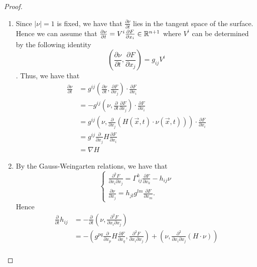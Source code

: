 \begin{proof}
\begin{enumerate}
		\item Since $\left| \nu \right| =1$ is fixed, we have that $\frac{\partial \nu }{\partial t} $ lies in the tangent space of the surface. Hence we can assume that $\frac{\partial \nu }{\partial t} = V^i \frac{\partial F}{\partial x_{i}} \in \mathbb{R}^{n+1}$ where $V^i$ can be determined by the following identity \[\left( \frac{\partial \nu }{\partial t} ,\frac{\partial F}{\partial x_{j}}  \right) = g_{ij}^{} V^i\]. Thus, we have that
		      \begin{equation*}
			      \begin{split}
				      \frac{\partial \nu }{\partial t} &=g_{}^{ij} \left( \frac{\partial \nu }{\partial t} ,\frac{\partial F}{\partial x_{j}}  \right) \cdot \frac{\partial F}{\partial x_{i}} \\
				      &= -g_{}^{ij} \left( \nu  ,\frac{\partial }{\partial t} \frac{\partial F}{\partial x_{j}}  \right) \cdot \frac{\partial F}{\partial x_{i}} \\
				      &= g_{}^{ij} \left( \nu  , \frac{\partial }{\partial x_{j}} (H (\vec{x},t) \cdot \nu (\vec{x},t) ) \right) \cdot \frac{\partial F}{\partial x_{i}} \\
				      &= g_{}^{ij} \frac{\partial }{\partial x_{j}} H \frac{\partial F}{\partial x_{i}} \\
				      &=\nabla H
			      \end{split}
		      \end{equation*}
		\item By the Gauss-Weingarten relations, we have that
		      \[
			      \begin{cases}
				      \frac{\partial ^2 F}{\partial x_{i} \partial x_{j}} = \Gamma_{\ ij}^{k} \frac{\partial F}{\partial x_{k}} -h_{ij}^{} \nu \\
				      \frac{\partial \nu }{\partial x_{j}} =h_{jl}^{} g_{}^{lm } \frac{\partial F}{\partial x_{m}} .
			      \end{cases}
		      \]
		      Hence
		      \begin{equation*}
			      \begin{split}
				      \frac{\partial }{\partial t} h_{ij}^{}  &= -\frac{\partial }{\partial t} \left( \nu , \frac{\partial^2 F}{\partial x_{i} \partial x_{j}} \right)  \\
				      &= -\left( g_{}^{pq } \frac{\partial }{\partial x_{p}} H \frac{\partial F}{\partial x_{q}} , \frac{\partial^2 F}{\partial x_{i} \partial x_{j}}  \right) + \left( \nu , \frac{\partial^2 }{\partial x_{i} \partial x_{j}} (H \cdot \nu ) \right) \\

\end{split}
\end{equation*}
\end{enumerate}
\end{proof}
